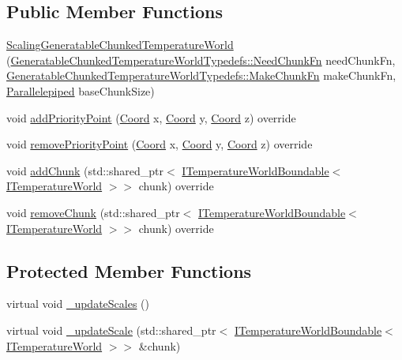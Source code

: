 \subsection*{Public Member Functions}
\begin{DoxyCompactItemize}
\item 
\hyperlink{class_scaling_generatable_chunked_temperature_world_a48b49e12d9005baf785c8d8782c240ad}{Scaling\-Generatable\-Chunked\-Temperature\-World} (\hyperlink{namespace_generatable_chunked_temperature_world_typedefs_a07d38658571f8f09839bc1bc8b105107}{Generatable\-Chunked\-Temperature\-World\-Typedefs\-::\-Need\-Chunk\-Fn} need\-Chunk\-Fn, \hyperlink{namespace_generatable_chunked_temperature_world_typedefs_a719e4469a105a21a76ed22274639c03a}{Generatable\-Chunked\-Temperature\-World\-Typedefs\-::\-Make\-Chunk\-Fn} make\-Chunk\-Fn, \hyperlink{struct_parallelepiped}{Parallelepiped} base\-Chunk\-Size)
\item 
void \hyperlink{class_scaling_generatable_chunked_temperature_world_ac8135352da17faeb9c41f1273630aa41}{add\-Priority\-Point} (\hyperlink{struct_coord}{Coord} x, \hyperlink{struct_coord}{Coord} y, \hyperlink{struct_coord}{Coord} z) override
\item 
void \hyperlink{class_scaling_generatable_chunked_temperature_world_aff6258637594e1b5b0e25ba628d22b20}{remove\-Priority\-Point} (\hyperlink{struct_coord}{Coord} x, \hyperlink{struct_coord}{Coord} y, \hyperlink{struct_coord}{Coord} z) override
\item 
void \hyperlink{class_scaling_generatable_chunked_temperature_world_a5ec1b1a2a5e058bf57bd7918fcc5a35b}{add\-Chunk} (std\-::shared\-\_\-ptr$<$ \hyperlink{class_i_temperature_world_boundable}{I\-Temperature\-World\-Boundable}$<$ \hyperlink{class_i_temperature_world}{I\-Temperature\-World} $>$$>$ chunk) override
\item 
void \hyperlink{class_scaling_generatable_chunked_temperature_world_ac3ae4d696d934b925076eeab88658978}{remove\-Chunk} (std\-::shared\-\_\-ptr$<$ \hyperlink{class_i_temperature_world_boundable}{I\-Temperature\-World\-Boundable}$<$ \hyperlink{class_i_temperature_world}{I\-Temperature\-World} $>$$>$ chunk) override
\end{DoxyCompactItemize}
\subsection*{Protected Member Functions}
\begin{DoxyCompactItemize}
\item 
virtual void \hyperlink{class_scaling_generatable_chunked_temperature_world_aabf0380970fd95dfa8d88298f0ae07e9}{\-\_\-update\-Scales} ()
\item 
virtual void \hyperlink{class_scaling_generatable_chunked_temperature_world_ab7385d1183770678642190af9369ffaf}{\-\_\-update\-Scale} (std\-::shared\-\_\-ptr$<$ \hyperlink{class_i_temperature_world_boundable}{I\-Temperature\-World\-Boundable}$<$ \hyperlink{class_i_temperature_world}{I\-Temperature\-World} $>$$>$ \&chunk)
\end{DoxyCompactItemize}
